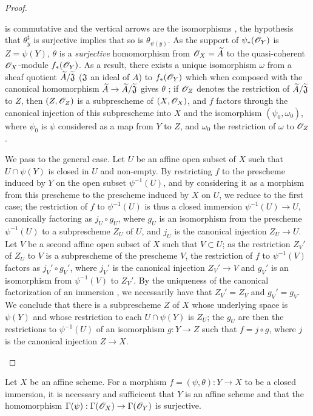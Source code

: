 \begin{proof}
\begin{enumerate}[label=(\alph*)]
\[{      }
    \]
    is commutative and the vertical arrows are the isomorphisms , the hypothesis that $\theta_y^\sharp$ is surjective implies that so is $\theta_{\psi(y)}$.
    As the support of $\psi_*(\mathscr{O}_Y)$ is $Z=\psi(Y)$, $\theta$ is a \emph{surjective} homomorphism from $\mathscr{O}_X=\widetilde{A}$ to the quasi-coherent $\mathscr{O}_X$-module $f_*(\mathscr{O}_Y)$.
    As a result, there exists a unique isomorphism $\omega$ from a sheaf quotient $\widetilde{A}/\widetilde{\mathfrak{J}}$ ($\mathfrak{J}$ an ideal of $A$) to $f_*(\mathscr{O}_Y)$ which when composed with the canonical homomorphism $\widetilde{A}\to\widetilde{A}/\widetilde{\mathfrak{J}}$ gives $\theta$ ; if $\mathscr{O}_Z$ denotes the restriction of $\widetilde{A}/\widetilde{\mathfrak{J}}$ to $Z$, then $(Z,\mathscr{O}_Z)$ is a subprescheme of $(X,\mathscr{O}_X)$, and $f$ factors through the canonical injection of this subprescheme into $X$ and the isomorphism $(\psi_0,\omega_0)$, where $\psi_0$ is $\psi$ considered as a map from $Y$ to $Z$, and $\omega_0$ the restriction of $\omega$ to $\mathscr{O}_Z$.

    We pass to the general case.
    Let $U$ be an affine open subset of $X$ such that $U\cap\psi(Y)$ is closed in $U$ and non-empty.
    By restricting $f$ to the prescheme induced by $Y$ on the open subset $\psi^{-1}(U)$, and by considering it as a morphism from this prescheme to the prescheme induced by $X$ on $U$, we reduce to the first case; the restriction of $f$ to $\psi^{-1}(U)$ is thus a closed immersion $\psi^{-1}(U)\to U$, canonically factoring as $j_U\circ g_U$, where $g_U$ is an isomorphism from the prescheme $\psi^{-1}(U)$ to a subprescheme $Z_U$ of $U$, and $j_U$ is the canonical injection $Z_U\to U$.
    Let $V$ be a second affine open subset of $X$ such that $V\subset U$; as the restriction $Z_V'$ of $Z_U$ to $V$ is a subprescheme of the prescheme $V$, the restriction of $f$ to $\psi^{-1}(V)$ factors as $j_V'\circ g_V'$, where $j_V'$ is the canonical injection $Z_V'\to V$ and $g_V'$ is an isomorphism from $\psi^{-1}(V)$ to $Z_V'$.
    By the uniqueness of the canonical factorization of an immersion , we necessarily have that $Z_V'=Z_V$ and $g_V'=g_V$.
    We conclude  that there is a subprescheme $Z$ of $X$ whose underlying space is $\psi(Y)$ and whose restriction to each $U\cap\psi(Y)$ is $Z_U$; the $g_U$ are then the restrictions to $\psi^{-1}(U)$ of an isomorphism $g:Y\to Z$ such that $f=j\circ g$, where $j$ is the canonical injection $Z\to X$.
\end{enumerate}
\end{proof}

\begin{cor}[4.2.3]
\label{1.4.2.3}
Let $X$ be an affine scheme.
For a morphism $f=(\psi,\theta):Y\to X$ to be a closed immersion, it is necessary and sufficicent that $Y$ is an affine scheme and that the homomorphism $\Gamma(\psi):\Gamma(\mathscr{O}_X)\to\Gamma(\mathscr{O}_Y)$ is surjective.
\end{cor}

